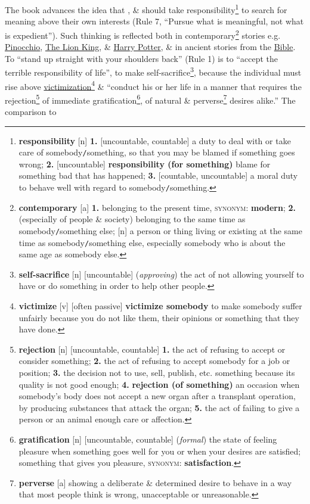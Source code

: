 \documentclass[oneside]{book}
\numberwithin{equation}{section}
\begin{document}
The book advances the idea that , \& should take responsibility\footnote{\textbf{responsibility} [n] \textbf{1.} [uncountable, countable] a duty to deal with or take care of somebody\texttt{/}something, so that you may be blamed if something goes wrong; \textbf{2.} [uncountable] \textbf{responsibility (for something)} blame for something bad that has happened; \textbf{3.} [countable, uncountable] a moral duty to behave well with regard to somebody\texttt{/}something.} to search for meaning above their own interests (Rule 7, ``Pursue what is meaningful, not what is expedient''). Such thinking is reflected both in contemporary\footnote{\textbf{contemporary} [a] \textbf{1.} belonging to the present time, \textsc{synonym}: \textbf{modern}; \textbf{2.} (especially of people \& society) belonging to the same time as somebody\texttt{/}something else; [n] a person or thing living or existing at the same time as somebody\texttt{/}something else, especially somebody who is about the same age as somebody else.} stories e.g. \href{https://en.wikipedia.org/wiki/Pinocchio_(1940_film)}{Pinocchio}, \href{https://en.wikipedia.org/wiki/The_Lion_King}{The Lion King}, \& \href{https://en.wikipedia.org/wiki/Harry_Potter}{Harry Potter}, \& in ancient stories from the \href{https://en.wikipedia.org/wiki/Bible}{Bible}. To ``stand up straight with your shoulders back'' (Rule 1) is to ``accept the terrible responsibility of life'', to make self-sacrifice\footnote{\textbf{self-sacrifice} [n] [uncountable] (\textit{approving}) the act of not allowing yourself to have or do something in order to help other people.}, because the individual must rise above \href{https://en.wikipedia.org/wiki/Victimisation}{victimization}\footnote{\textbf{victimize} [v] [often passive] \textbf{victimize somebody} to make somebody suffer unfairly because you do not like them, their opinions or something that they have done.} \& ``conduct his or her life in a manner that requires the rejection\footnote{\textbf{rejection} [n] [uncountable, countable] \textbf{1.} the act of refusing to accept or consider something; \textbf{2.} the act of refusing to accept somebody for a job or position; \textbf{3.} the decision not to use, sell, publish, etc. something because its quality is not good enough; \textbf{4.} \textbf{rejection (of something)} an occasion when somebody's body does not accept a new organ after a transplant operation, by producing substances that attack the organ; \textbf{5.} the act of failing to give a person or an animal enough care or affection.} of immediate gratification\footnote{\textbf{gratification} [n] [uncountable, countable] (\textit{formal}) the state of feeling pleasure when something goes well for you or when your desires are satisfied; something that gives you pleasure, \textsc{synonym}: \textbf{satisfaction}.}, of natural \& perverse\footnote{\textbf{perverse} [a] showing a deliberate \& determined desire to behave in a way that most people think is wrong, unacceptable or unreasonable.} desires alike.'' The comparison to 
\end{document}

